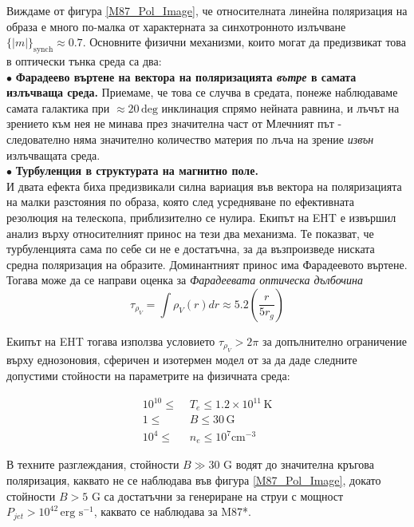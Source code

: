  \noindent Виждаме от фигура \ref{M87_Pol_Image}, че относителната линейна поляризация на образа е много по-малка от характерната за синхотронното излъчване $\lbrace |m| \rbrace_\text{synch}\approx 0.7$. Основните физични механизми, които могат да предизвикат това в оптически тънка среда са два:\\\newline
 $\bullet$ \textbf{Фарадеево въртене на вектора на поляризацията \emph{вътре} в самата излъчваща среда.} Приемаме, че това се случва в средата, понеже наблюдаваме самата галактика при $\approx 20\,\text{deg}$ инклинация спрямо нейната равнина, и лъчът на зрението към нея не минава през значителна част от Млечният път - следователно няма значително количество материя по лъча на зрение \emph{извън} излъчващата среда.\\
 $\bullet$ \textbf{Турбуленция в структурата на магнитно поле.}\\\newline
И двата ефекта биха предизвикали силна вариация във вектора на поляризацията на малки разстояния по образа, която след усредняване по ефективната резолюция на телескопа, приблизително се нулира. Екипът на EHT е извършил анализ върху относителният принос на тези два механизма. Те показват, че турбуленцията сама по себе си не е достатъчна, за да възпроизведе ниската средна поляризация на образите. Доминантният принос има Фарадеевото въртене. Тогава може да се направи оценка за \emph{Фарадеевата оптическа дълбочина} \cite{EHT_M87_VIII}
\begin{equation}
	\tau_{\rho_V} = \int \rho_{V}(r)dr\approx 5.2\left(\frac{r}{5r_g}\right)
\end{equation}
\lfoot{}

Екипът на EHT тогава използва условието $\tau_{\rho_V}>2\pi$ за допълнително ограничение върху еднозоновия, сферичен и изотермен модел от \cite{EHT_M87_V} за да даде следните допустими стойности на параметрите на физичната среда:

\begin{equation}
	\begin{split}
		10^{10} \le\,\, &T_e \le 1.2 \times 10^{11}\,\text{K}\\
		1 \le\,\, &B \le 30\, \text{G}\\
		10^4 \le\,\, &n_e \le 10^7 \text{cm}^{-3}
	\end{split}
\end{equation}

В техните разглеждания, стойности $B \gg 30$ G водят до значителна кръгова поляризация, каквато не се наблюдава във фигура \ref{M87_Pol_Image}, докато стойности $B > 5$ G са достатъчни за генериране на струи с мощност $P_{jet} > 10^{42}\,\text{erg s}^{-1}$, каквато се наблюдава за M87*.\\

